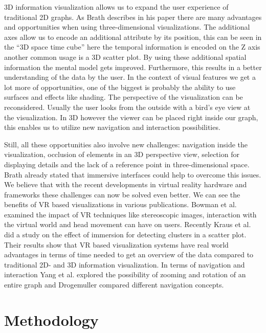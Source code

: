 3D information visualization allows us to expand the user experience of traditional 2D graphs. As Brath describes in his paper \cite{brath_3d_2014} there are many advantages and opportunities when using three-dimensional visualizations.
The additional axes allow us to encode an additional attribute by its position, this can be seen in the “3D space time cube” \cite{brath_3d_2014} here the temporal information is encoded on the Z axis another common usage is a 3D scatter plot. By using these additional spatial information the mental model gets improved. Furthermore, this results in a better understanding of the data by the user.
In the context of visual features we get a lot more of opportunities, one of the biggest is probably the ability to use surfaces and effects like shading. 
The perspective of the visualization can be reconsidered. Usually the user looks from the outside with a
bird's eye view at the visualization. In 3D however the viewer can be placed right inside our graph, this enables us to utilize new navigation and interaction possibilities. 

Still, all these opportunities also involve new challenges: navigation inside the visualization, occlusion of elements in an 3D perspective view, selection for displaying details and the lack of a reference point in three-dimensional space. Brath \cite{brath_3d_2014} already stated that immersive interfaces could help to overcome this issues.
 We believe that with the recent developments in virtual reality hardware and frameworks these challenges can now be solved even better. 
 We can see the benefits of VR based visualizations in various publications. Bowman et al. \cite{bowman_virtual_2007} examined the impact of VR techniques like stereoscopic images, interaction with the virtual world and head movement can have on users. 
 Recently Kraus et al. \cite{kraus_impact_2020} did a study on the effect of immersion for detecting clusters in a scatter plot. Their results show that VR based visualization systems have real world advantages in terms of time needed to get an overview of the data compared to traditional 2D- and 3D information visualization. In terms of navigation and interaction Yang et al. \cite{yang_embodied_2020} explored the possibility of zooming and rotation of an entire graph and Drogemuller \cite{drogemuller_examining_2020} compared different navigation concepts.
 
 \section{Methodology}


